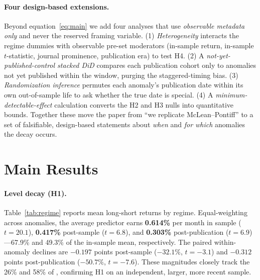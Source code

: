 \documentclass[12pt]{article}
\begin{document}
\paragraph{Four design-based extensions.} Beyond equation~\eqref{eq:main} we add four analyses
that use \emph{observable metadata only} and never the reserved framing variable. (1)
\emph{Heterogeneity} interacts the regime dummies with observable pre-set moderators (in-sample
return, in-sample $t$-statistic, journal prominence, publication era) to test H4. (2) A
\emph{not-yet-published-control stacked DiD} compares each publication cohort only to anomalies
not yet published within the window, purging the staggered-timing bias. (3)
\emph{Randomization inference} permutes each anomaly's publication date within its own
out-of-sample life to ask whether the true date is special. (4) A \emph{minimum-detectable-effect}
calculation converts the H2 and H3 nulls into quantitative bounds. Together these move the paper
from ``we replicate McLean--Pontiff'' to a set of falsifiable, design-based statements about
\emph{when} and \emph{for which} anomalies the decay occurs.

\section{Main Results}\label{sec:res}
\paragraph{Level decay (H1).} Table~\ref{tab:regime} reports mean long-short returns by regime.
Equal-weighting across anomalies, the average predictor earns \textbf{0.614\%} per month in
sample ($t=20.1$), \textbf{0.417\%} post-sample ($t=6.8$), and \textbf{0.303\%}
post-publication ($t=6.9$)---67.9\% and 49.3\% of the in-sample mean, respectively. The paired
within-anomaly declines are $-0.197$ points post-sample ($-32.1\%$, $t=-3.1$) and $-0.312$
points post-publication ($-50.7\%$, $t=-7.6$). These magnitudes closely track the 26\% and
58\% of \citet{mcleanpontiff2016}, confirming H1 on an independent, larger, more recent sample.
\end{document}
